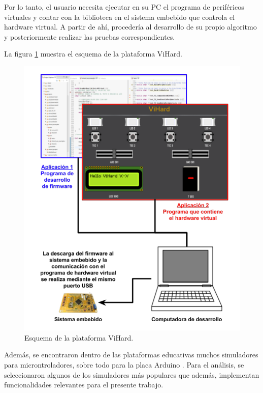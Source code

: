 Por lo tanto, el usuario necesita ejecutar en su PC el programa de periféricos virtuales y contar con la biblioteca en el sistema embebido que controla el hardware virtual. A partir de ahí, procedería al desarrollo de su propio algoritmo y posteriormente realizar las pruebas correspondientes.


La figura \ref{fig:ViHard} muestra el esquema de la plataforma ViHard.

\begin{figure}[ht]
	\centering
	\includegraphics[scale=.40]{./Figures/ViHard.png}
	\caption{Esquema de la plataforma ViHard.\protect\footnotemark}
	\label{fig:ViHard}
\end{figure}


Además, se encontraron dentro de las plataformas educativas muchos simuladores para microntroladores, sobre todo para la placa Arduino \citep{Arduino}. Para el análisis, se seleccionaron algunos de los simuladores más populares que además, implementan funcionalidades relevantes para el presente trabajo. 

